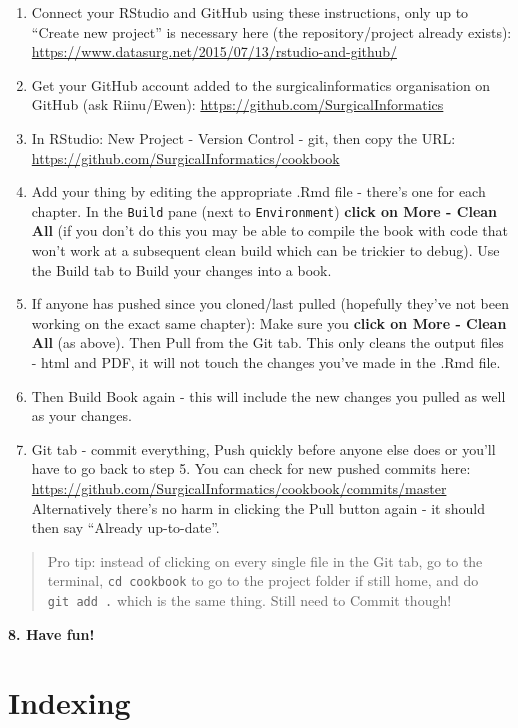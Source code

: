 \documentclass[
]{book}
\begin{document}
\begin{enumerate}
\def\labelenumi{\arabic{enumi}.}
\item
  Connect your RStudio and GitHub using these instructions, only up to ``Create new project'' is necessary here (the repository/project already exists):
  \url{https://www.datasurg.net/2015/07/13/rstudio-and-github/}
\item
  Get your GitHub account added to the surgicalinformatics organisation on GitHub (ask Riinu/Ewen):
  \url{https://github.com/SurgicalInformatics}
\item
  In RStudio: New Project - Version Control - git, then copy the URL: \url{https://github.com/SurgicalInformatics/cookbook}
\item
  Add your thing by editing the appropriate .Rmd file - there's one for each chapter. In the \texttt{Build} pane (next to \texttt{Environment}) \textbf{click on More - Clean All} (if you don't do this you may be able to compile the book with code that won't work at a subsequent clean build which can be trickier to debug). Use the Build tab to Build your changes into a book.
\item
  If anyone has pushed since you cloned/last pulled (hopefully they've not been working on the exact same chapter): Make sure you \textbf{click on More - Clean All} (as above). Then Pull from the Git tab. This only cleans the output files - html and PDF, it will not touch the changes you've made in the .Rmd file.
\item
  Then Build Book again - this will include the new changes you pulled as well as your changes.
\item
  Git tab - commit everything, Push quickly before anyone else does or you'll have to go back to step 5. You can check for new pushed commits here: \url{https://github.com/SurgicalInformatics/cookbook/commits/master} Alternatively there's no harm in clicking the Pull button again - it should then say ``Already up-to-date''.
\end{enumerate}

\begin{quote}
Pro tip: instead of clicking on every single file in the Git tab, go to the terminal, \texttt{cd\ cookbook} to go to the project folder if still home, and do \texttt{git\ add\ .} which is the same thing. Still need to Commit though!
\end{quote}

\textbf{8. Have fun!}

\hypertarget{indexing}{%
\section{Indexing}\label{indexing}}
\end{document}
